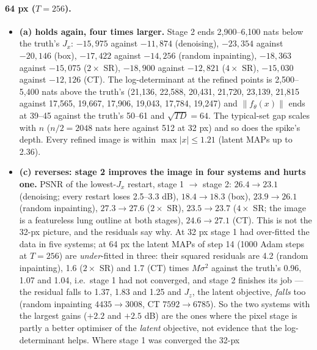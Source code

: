 \documentclass[11pt]{article}
\begin{document}
\paragraph{64 px ($T = 256$).}
\begin{itemize}
  \item \textbf{(a) holds again, four times larger.} Stage 2 ends
        2,900--6,100 nats below the truth's $J_x$: $-15{,}975$ against
        $-11{,}874$ (denoising), $-23{,}354$ against $-20{,}146$ (box),
        $-17{,}422$ against $-14{,}256$ (random inpainting), $-18{,}363$
        against $-15{,}075$ ($2\times$ SR), $-18{,}900$ against $-12{,}821$
        ($4\times$ SR), $-15{,}030$ against $-12{,}126$ (CT). The
        log-determinant at the refined points is 2,500--5,400 nats above the
        truth's (21,136, 22,588, 20,431, 21,720, 23,139, 21,815 against
        17,565, 19,667, 17,906, 19,043, 17,784, 19,247) and $\|f_\theta(x)\|$
        ends at 39--45 against the truth's 50--61 and $\sqrt{TD} = 64$. The
        typical-set gap scales with $n$ ($n/2 = 2048$ nats here against 512
        at 32 px) and so does the spike's depth. Every refined image is
        within $\max|x| \le 1.21$ (latent MAPs up to 2.36).
  \item \textbf{(c) reverses: stage 2 improves the image in four systems
        and hurts one.} PSNR of the lowest-$J_x$ restart, stage 1 $\to$
        stage 2: $26.4 \to 23.1$ (denoising; every restart loses 2.5--3.3
        dB), $18.4 \to 18.3$ (box), $23.9 \to 26.1$ (random inpainting),
        $27.3 \to 27.6$ ($2\times$ SR), $23.5 \to 23.7$ ($4\times$ SR;
        the image is a featureless lung outline at both stages), $24.6 \to
        27.1$ (CT). This is not the 32-px picture, and the residuals say
        why. At 32 px stage 1 had over-fitted the data in five systems;
        at 64 px the latent MAPs of step 14 (1000 Adam steps at $T = 256$)
        are \emph{under}-fitted in three: their squared residuals are 4.2
        (random inpainting), 1.6 ($2\times$ SR) and 1.7 (CT) times
        $M\sigma^2$ against the truth's 0.96, 1.07 and 1.04, i.e.\ stage 1
        had not converged, and stage 2 finishes its job --- the residual
        falls to 1.37, 1.83 and 1.25 and $J_z$, the latent objective,
        \emph{falls} too (random inpainting $4435 \to 3008$, CT $7592 \to
        6785$). So the two systems with the largest gains ($+2.2$ and
        $+2.5$ dB) are the ones where the pixel stage is partly a better
        optimiser of the \emph{latent} objective, not evidence that the
        log-determinant helps. Where stage 1 was converged the 32-px

\end{itemize}
\end{document}
